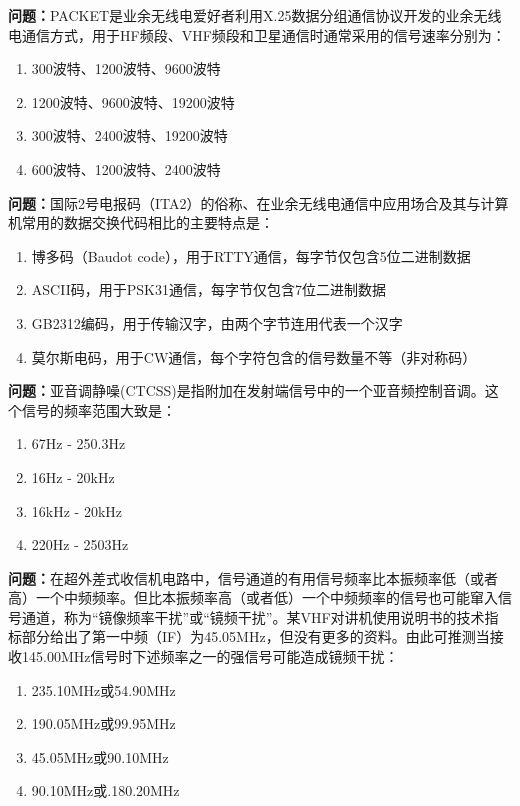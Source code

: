 \bigskip


\noindent\textbf{问题：}PACKET是业余无线电爱好者利用X.25数据分组通信协议开发的业余无线电通信方式，用于HF频段、VHF频段和卫星通信时通常采用的信号速率分别为：
\begin{enumerate}[label=\Alph*), leftmargin=3em]
\item 300波特、1200波特、9600波特
\item 1200波特、9600波特、19200波特
\item 300波特、2400波特、19200波特
\item 600波特、1200波特、2400波特
\end{enumerate}

\bigskip


\noindent\textbf{问题：}国际2号电报码（ITA2）的俗称、在业余无线电通信中应用场合及其与计算机常用的数据交换代码相比的主要特点是：
\begin{enumerate}[label=\Alph*), leftmargin=3em]
\item 博多码（Baudot code），用于RTTY通信，每字节仅包含5位二进制数据
\item ASCII码，用于PSK31通信，每字节仅包含7位二进制数据
\item GB2312编码，用于传输汉字，由两个字节连用代表一个汉字
\item 莫尔斯电码，用于CW通信，每个字符包含的信号数量不等（非对称码）
\end{enumerate}

\bigskip


\noindent\textbf{问题：}亚音调静噪(CTCSS)是指附加在发射端信号中的一个亚音频控制音调。这个信号的频率范围大致是：
\begin{enumerate}[label=\Alph*), leftmargin=3em]
\item 67Hz - 250.3Hz
\item 16Hz - 20kHz
\item 16kHz - 20kHz
\item 220Hz - 2503Hz
\end{enumerate}

\bigskip


\noindent\textbf{问题：}在超外差式收信机电路中，信号通道的有用信号频率比本振频率低（或者高）一个中频频率。但比本振频率高（或者低）一个中频频率的信号也可能窜入信号通道，称为“镜像频率干扰”或“镜频干扰”。某VHF对讲机使用说明书的技术指标部分给出了第一中频（IF）为45.05MHz，但没有更多的资料。由此可推测当接收145.00MHz信号时下述频率之一的强信号可能造成镜频干扰：
\begin{enumerate}[label=\Alph*), leftmargin=3em]
\item 235.10MHz或54.90MHz
\item 190.05MHz或99.95MHz
\item 45.05MHz或90.10MHz
\item 90.10MHz或.180.20MHz
\end{enumerate}

